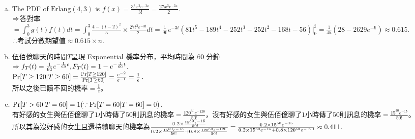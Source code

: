 \begin{pr}$ $
\begin{enumerate}[(a)]
\item The PDF of $\mathrm{Erlang}(4, 3)$ is $f(x)=\frac{3^4x^3e^{-3x}}{3!}=\frac{27x^3e^{-3x}}{2}$.\\
$\then$答對率$=\int_0^3g(t)f(t)dt=\int_0^3\frac{4-(t-2)^2}5\times\frac{27t^3e^{-3t}}2dt=\frac1{90}e^{-3t}(81t^5-189t^4-252t^3-252t^2-168t-56)|_0^3=\frac1{45}(28-2629e^{-9})\approx0.615$.\\
$\so$考試分數期望值$\approx0.615\times n$.
\item 伍佰億聊天的時間$T$呈現 Exponential 機率分布，平均時間為 60 分鐘\\
$\then f_T(t)=\frac1{60}e^{-\frac1{60}t}, F_T(t)=1-e^{-\frac1{60}t}$.\\
$\P[T\geq120|T\geq60]=\frac{\P[T\geq120]}{\P[T\geq60]}=\frac{e^{-2}}{e^{-1}}=\frac1e$.\\
所以之後已讀不回的機率$=\frac1e$。
\item $\P[T>60|T=60]=1(\cuz\P[T=60|T=60]=0)$.\\
有好感的女生與伍佰億聊了$1$小時傳了$50$則訊息的機率$=\frac{120^{50}e^{-120}}{50!}$，沒有好感的女生與伍佰億聊了$1$小時傳了$50$則訊息的機率$=\frac{15^{50}e^{-15}}{50!}$。\\
所以其為沒好感的女生且還持續聊天的機率為$\frac{0.2\times\frac{15^{50}e^{-15}}{50!}}{0.2\times\frac{15^{50}e^{-15}}{50!}+0.8\times\frac{120^{50}e^{-120}}{50!}}\\=\frac{0.2\times15^{50}e^{-15}}{0.2\times15^{50}e^{-15}+0.8\times120^{50}e^{-120}}\approx0.411$.
\end{enumerate}
\end{pr}
